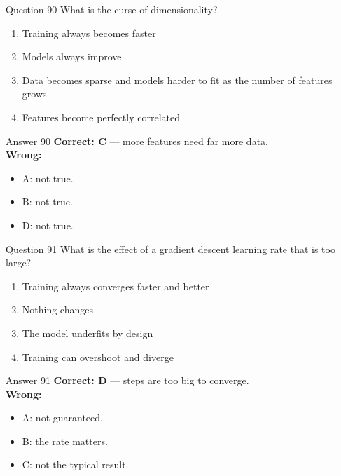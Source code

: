 \documentclass[aspectratio=169,11pt]{beamer}
\begin{document}
\begin{frame}{Question 90}
What is the curse of dimensionality?
\begin{enumerate}[label=\Alph*.]
\item Training always becomes faster
\item Models always improve
\item Data becomes sparse and models harder to fit as the number of features grows
\item Features become perfectly correlated
\end{enumerate}
\end{frame}
\begin{frame}{Answer 90}
\textbf{Correct: C} --- more features need far more data.\\
\vspace{0.5em}
\textbf{Wrong:}
\begin{itemize}
\item A: not true.
\item B: not true.
\item D: not true.
\end{itemize}
\end{frame}

\begin{frame}{Question 91}
What is the effect of a gradient descent learning rate that is too large?
\begin{enumerate}[label=\Alph*.]
\item Training always converges faster and better
\item Nothing changes
\item The model underfits by design
\item Training can overshoot and diverge
\end{enumerate}
\end{frame}
\begin{frame}{Answer 91}
\textbf{Correct: D} --- steps are too big to converge.\\
\vspace{0.5em}
\textbf{Wrong:}
\begin{itemize}
\item A: not guaranteed.
\item B: the rate matters.
\item C: not the typical result.
\end{itemize}
\end{frame}
\end{document}
